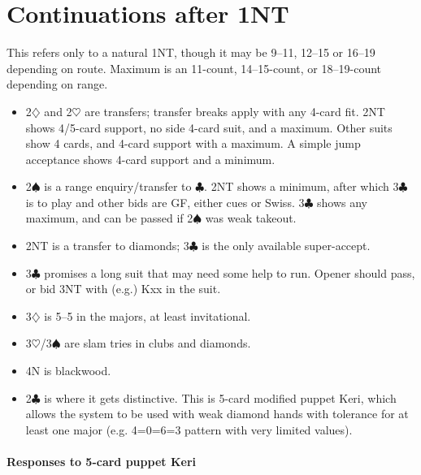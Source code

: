 \documentclass[a4paper,12pt]{article}
\begin{document}
\begin{itemize}
\end{itemize}

\section{Continuations after 1NT}

This refers only to a natural 1NT, though it may be 9--11, 12--15 or 16--19
depending on route. Maximum is an 11-count, 14--15-count, or 18--19-count
depending on range.

\begin{itemize}

\item 2$\diamondsuit$ and 2$\heartsuit$ are transfers; transfer breaks apply with any 4-card fit.  2NT
shows 4/5-card support, no side 4-card suit, and a maximum.  Other suits
show 4 cards, and 4-card support with a maximum.  A simple jump acceptance
shows 4-card support and a minimum.

\item 2$\spadesuit$ is a range enquiry/transfer to $\clubsuit$.  2NT shows a minimum, after which 3$\clubsuit$ is to
play and other bids are GF, either cues or Swiss.  3$\clubsuit$ shows any maximum, and
can be passed if 2$\spadesuit$ was weak takeout.

\item 2NT is a transfer to diamonds; 3$\clubsuit$ is the only available super-accept.

\item 3$\clubsuit$ promises a long suit that may need some help to run.  Opener should
pass, or bid 3NT with (e.g.) Kxx in the suit.

\item 3$\diamondsuit$ is 5--5 in the majors, at least invitational.

\item 3$\heartsuit$/3$\spadesuit$ are slam tries in clubs and diamonds.

\item 4N is blackwood.

\item 2$\clubsuit$ is where it gets distinctive.  This is 5-card modified puppet Keri, which allows the system to be used with weak diamond hands with tolerance for at least one major (e.g. 4=0=6=3 pattern with very limited values).
\end{itemize}

\paragraph{Responses to 5-card puppet Keri}
\end{document}
